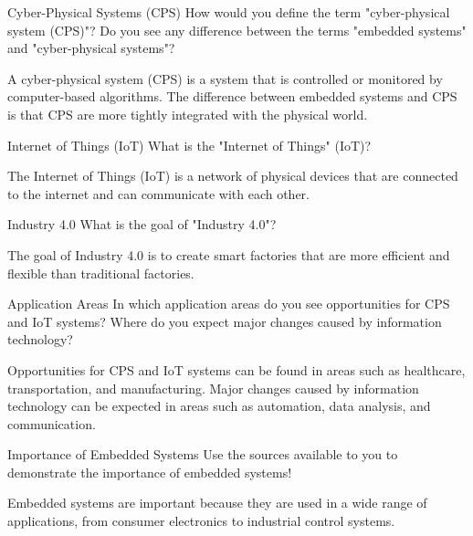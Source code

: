 \documentclass{article}
\begin{document}
\begin{exercise}{Cyber-Physical Systems (CPS)}
  How would you define the term "cyber-physical system (CPS)"? Do you see any difference between the terms "embedded systems" and "cyber-physical systems"?

  \begin{solution}
    A cyber-physical system (CPS) is a system that is controlled or monitored by computer-based algorithms. The difference between embedded systems and CPS is that CPS are more tightly integrated with the physical world.
  \end{solution}
\end{exercise}

\begin{exercise}{Internet of Things (IoT)}
  What is the "Internet of Things" (IoT)?

  \begin{solution}
    The Internet of Things (IoT) is a network of physical devices that are connected to the internet and can communicate with each other.
  \end{solution}
\end{exercise}

\begin{exercise}{Industry 4.0}
  What is the goal of "Industry 4.0"?

  \begin{solution}
    The goal of Industry 4.0 is to create smart factories that are more efficient and flexible than traditional factories.
  \end{solution}
\end{exercise}

\begin{exercise}{Application Areas}
  In which application areas do you see opportunities for CPS and IoT systems? Where do you expect major changes caused by information technology?

  \begin{solution}
    Opportunities for CPS and IoT systems can be found in areas such as healthcare, transportation, and manufacturing. Major changes caused by information technology can be expected in areas such as automation, data analysis, and communication.
  \end{solution}
\end{exercise}

\begin{exercise}{Importance of Embedded Systems}
  Use the sources available to you to demonstrate the importance of embedded systems!

  \begin{solution}
    Embedded systems are important because they are used in a wide range of applications, from consumer electronics to industrial control systems.
  \end{solution}
\end{exercise}
\end{document}
